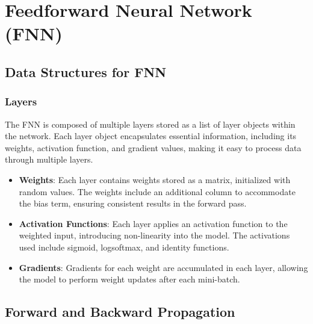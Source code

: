 \documentclass{article}
\begin{document}
\section{Feedforward Neural Network (FNN)}

\subsection{Data Structures for FNN}

\subsubsection{\textbf{Layers}}
The FNN is composed of multiple layers stored as a list of layer objects within the network. Each layer object encapsulates essential information, including its weights, activation function, and gradient values, making it easy to process data through multiple layers.

\begin{itemize}
    \item \textbf{Weights}: Each layer contains weights stored as a matrix, initialized with random values. The weights include an additional column to accommodate the bias term, ensuring consistent results in the forward pass.
    \item \textbf{Activation Functions}: Each layer applies an activation function to the weighted input, introducing non-linearity into the model. The activations used include sigmoid, logsoftmax, and identity functions.
    \item \textbf{Gradients}: Gradients for each weight are accumulated in each layer, allowing the model to perform weight updates after each mini-batch.
\end{itemize}

\subsection{Forward and Backward Propagation}
\end{document}
